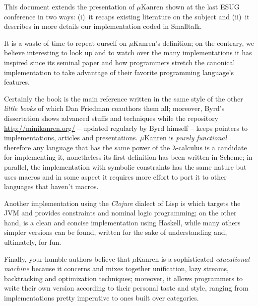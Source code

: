 
This document extends the presentation of $\mu$Kanren shown at the last ESUG
conference \citep{ESUG2018} in two ways: (i)~it recaps existing literature 
on the subject and (ii)~it describes in more details our implementation coded
in Smalltalk.

It is a waste of time to repeat ourself on $\mu$Kanren's definition; on the
contrary, we believe interesting to look up and to watch over the many
implementations it has inspired since its seminal paper \citep{Hemann:muKanren}
and how programmers stretch the canonical implementation to take advantage of
their favorite programming language's features.

Certainly the book \citep{Friedman:Reasoned:Schemer} is the main reference
written in the same style of the other \emph{little books} of which Dan
Friedman coauthors them all; moreover, Byrd's dissertation \citep{Byrd:PhD}
shows advanced stuffs and techniques while the repository
\url{http://minikanren.org/} -- updated regularly by Byrd himself -- keeps
pointers to implementations, articles and presentations.  $\mu$Kanren is
\emph{purely functional} therefore any language that has the same power of the
$\lambda$-calculus is a candidate for implementing it, nonetheless its first
definition has been written in Scheme; in parallel, the implementation with
symbolic constraints has the same nature but uses macros and in some aspect it
requires more effort to port it to other languages that haven't macros.

Another implementation using the \emph{Clojure} dialect of Lisp is
\citep{clojure:core.logic} which targets the JVM and provides constraints and
nominal logic programming; on the other hand, \citep{sullivan:microkanrenhs}
is a clean and concise implementation using Haskell, while many others simpler
versions can be found, written for the sake of understanding and, ultimately,
for fun.

Finally, your humble authors believe that $\mu$Kanren is a sophisticated
\textit{educational machine} because it concerns and mixes together unification,
lazy streams, backtracking and optimization techniques; moreover, it allows
programmers to write their own version according to their personal taste and
style, ranging from implementations pretty imperative to ones built over
categories. 

